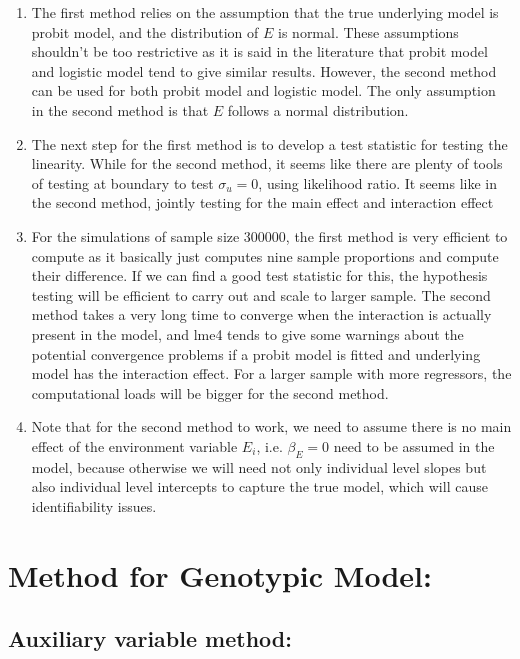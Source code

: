 \documentclass[
]{article}
\begin{document}
\begin{enumerate}
\item The first method relies on the assumption that the true underlying model is probit model, and the distribution of $E$ is normal. These assumptions shouldn't be too restrictive as it is said in the literature that probit model and logistic model tend to give similar results. However, the second method can be used for both probit model and logistic model. The only assumption in the second method is that $E$ follows a normal distribution.
\item The next step for the first method is to develop a test statistic for testing the linearity. While for the second method, it seems like there are plenty of tools of testing at boundary to test $\sigma_u = 0$, using likelihood ratio. It seems like in the second method, jointly testing for the main effect and interaction effect 
\item For the simulations of sample size 300000, the first method is very efficient to compute as it basically just computes nine sample proportions and compute their difference. If we can find a good test statistic for this, the hypothesis testing will be efficient to carry out and scale to larger sample. The second method takes a very long time to converge when the interaction is actually present in the model, and lme4 tends to give some warnings about the potential convergence problems if a probit model is fitted and underlying model has the interaction effect. For a larger sample with more regressors, the computational loads will be bigger for the second method.
\item Note that for the second method to work, we need to assume there is no main effect of the environment variable $E_i$, i.e. $\beta_E = 0$ need to be assumed in the model, because otherwise we will need not only individual level slopes but also individual level intercepts to capture the true model, which will cause identifiability issues.
\end{enumerate}

\hypertarget{method-for-genotypic-model}{%
\section{Method for Genotypic Model:}\label{method-for-genotypic-model}}

\hypertarget{auxiliary-variable-method}{%
\subsection{Auxiliary variable
method:}\label{auxiliary-variable-method}}
\end{document}
